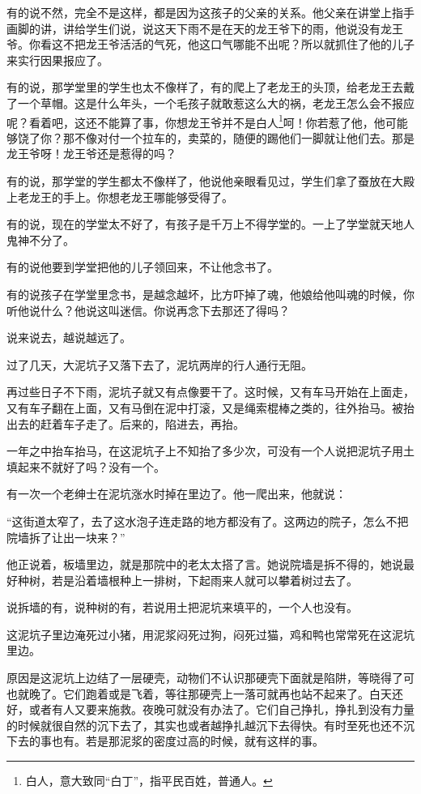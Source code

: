 \par 有的说不然，完全不是这样，都是因为这孩子的父亲的关系。他父亲在讲堂上指手画脚的讲，讲给学生们说，说这天下雨不是在天的龙王爷下的雨，他说没有龙王爷。你看这不把龙王爷活活的气死，他这口气哪能不出呢？所以就抓住了他的儿子来实行因果报应了。
\par 有的说，那学堂里的学生也太不像样了，有的爬上了老龙王的头顶，给老龙王去戴了一个草帽。这是什么年头，一个毛孩子就敢惹这么大的祸，老龙王怎么会不报应呢？看着吧，这还不能算了事，你想龙王爷并不是白人\footnote{白人，意大致同“白丁”，指平民百姓，普通人。}呵！你若惹了他，他可能够饶了你？那不像对付一个拉车的，卖菜的，随便的踢他们一脚就让他们去。那是龙王爷呀！龙王爷还是惹得的吗？
\par 有的说，那学堂的学生都太不像样了，他说他亲眼看见过，学生们拿了蚕放在大殿上老龙王的手上。你想老龙王哪能够受得了。
\par 有的说，现在的学堂太不好了，有孩子是千万上不得学堂的。一上了学堂就天地人鬼神不分了。
\par 有的说他要到学堂把他的儿子领回来，不让他念书了。
\par 有的说孩子在学堂里念书，是越念越坏，比方吓掉了魂，他娘给他叫魂的时候，你听他说什么？他说这叫迷信。你说再念下去那还了得吗？
\par 说来说去，越说越远了。
\par 过了几天，大泥坑子又落下去了，泥坑两岸的行人通行无阻。
\par 再过些日子不下雨，泥坑子就又有点像要干了。这时候，又有车马开始在上面走，又有车子翻在上面，又有马倒在泥中打滚，又是绳索棍棒之类的，往外抬马。被抬出去的赶着车子走了。后来的，陷进去，再抬。
\par 一年之中抬车抬马，在这泥坑子上不知抬了多少次，可没有一个人说把泥坑子用土填起来不就好了吗？没有一个。
\par 有一次一个老绅士在泥坑涨水时掉在里边了。他一爬出来，他就说：
\par “这街道太窄了，去了这水泡子连走路的地方都没有了。这两边的院子，怎么不把院墙拆了让出一块来？”
\par 他正说着，板墙里边，就是那院中的老太太搭了言。她说院墙是拆不得的，她说最好种树，若是沿着墙根种上一排树，下起雨来人就可以攀着树过去了。
\par 说拆墙的有，说种树的有，若说用土把泥坑来填平的，一个人也没有。
\par 这泥坑子里边淹死过小猪，用泥浆闷死过狗，闷死过猫，鸡和鸭也常常死在这泥坑里边。
\par 原因是这泥坑上边结了一层硬壳，动物们不认识那硬壳下面就是陷阱，等晓得了可也就晚了。它们跑着或是飞着，等往那硬壳上一落可就再也站不起来了。白天还好，或者有人又要来施救。夜晚可就没有办法了。它们自己挣扎，挣扎到没有力量的时候就很自然的沉下去了，其实也或者越挣扎越沉下去得快。有时至死也还不沉下去的事也有。若是那泥浆的密度过高的时候，就有这样的事。
